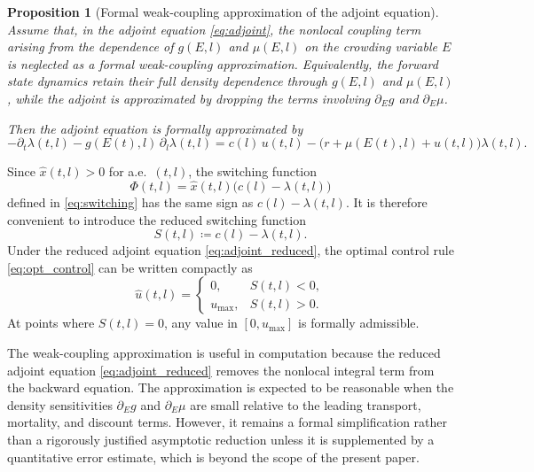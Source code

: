 \documentclass[pdflatex,sn-mathphys-num]{sn-jnl}
\theoremstyle{thmstyleone}
\newtheorem{proposition}[theorem]{Proposition}
\theoremstyle{definition}
\theoremstyle{remark}
\begin{document}
\begin{proposition}[Formal weak-coupling approximation of the adjoint equation]
\label{prop:weak}
Assume that, in the adjoint equation \eqref{eq:adjoint}, the nonlocal coupling term
arising from the dependence of $g(E,l)$ and $\mu(E,l)$ on the crowding variable $E$
is neglected as a formal weak-coupling approximation. Equivalently, the forward state
dynamics retain their full density dependence through $g(E,l)$ and $\mu(E,l)$, while
the adjoint is approximated by dropping the terms involving $\partial_E g$ and
$\partial_E\mu$.

Then the adjoint equation is formally approximated by
\begin{equation}\label{eq:adjoint_reduced}
-\partial_t\lambda(t,l)-g(E(t),l)\,\partial_l\lambda(t,l)
=
c(l)\,u(t,l)-\bigl(r+\mu(E(t),l)+u(t,l)\bigr)\lambda(t,l).
\end{equation}
\end{proposition}

Since $\hat x(t,l)>0$ for a.e.\ $(t,l)$, the switching function
\[
\Phi(t,l)=\hat x(t,l)\bigl(c(l)-\lambda(t,l)\bigr)
\]
defined in \eqref{eq:switching} has the same sign as $c(l)-\lambda(t,l)$. 
It is
therefore convenient to introduce the reduced switching function
\begin{equation}\label{eq:switchfunc_def}
S(t,l)\coloneqq c(l)-\lambda(t,l).
\end{equation}
Under the reduced adjoint equation \eqref{eq:adjoint_reduced}, the optimal control
rule \eqref{eq:opt_control} can be written compactly as
\begin{equation}\label{eq:u_star_sign}
\hat u(t,l)=
\begin{cases}
0, & S(t,l)<0,\\[4pt]
u_{\max}, & S(t,l)>0.
\end{cases}
\end{equation}
At points where $S(t,l)=0$, any value in $[0,u_{\max}]$ is formally admissible.

The weak-coupling approximation is useful in computation because the reduced adjoint
equation \eqref{eq:adjoint_reduced} removes the nonlocal integral term from the
backward equation. The approximation is expected to be reasonable when the
density sensitivities $\partial_E g$ and $\partial_E\mu$ are small relative to the
leading transport, mortality, and discount terms. However, it remains a formal
simplification rather than a rigorously justified asymptotic reduction unless it is
supplemented by a quantitative error estimate, which is beyond the scope of the
present paper.
\end{document}
